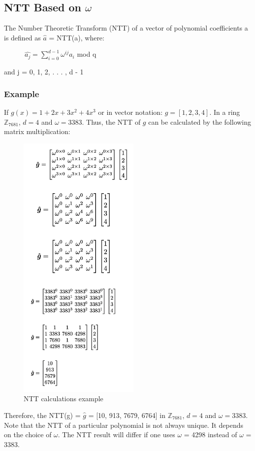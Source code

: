 \documentclass{techrep}
\theoremstyle{definition}
\theoremstyle{plain}
\newcommand{\Z}{\mathbb{Z}}
\begin{document}
	\subsection{NTT Based on $\omega$}
	The Number Theoretic Transform (NTT) of a vector of polynomial coefficients a is defined as $\hat{a}$ = NTT(a), where:

	$\quad \quad \quad \hat{a_j} = \sum_{i=0}^{d - 1}\omega^{ij}a_i$ mod q

	and j = 0, 1, 2, . . . , d - 1

	\subsubsection{Example}

	If $g(x) = 1 + 2x + 3x^2 + 4x^3$ or in vector notation:  $g = [1, 2, 3, 4]$.
	In a ring $\Z_{7681}$, $d = 4$ and $\omega =3383$. Thus, the NTT of $g$ can be calculated by the following matrix multiplication:


	\begin{figure}[H]
		\centering
		\includegraphics[width=.4\columnwidth]{fig/NTT_cal.png}
		\caption{NTT calculations example}
		\label{fig:NTT_cal}
	\end{figure}

	Therefore, the NTT(g) = $\hat{g}$ = [10, 913, 7679, 6764] in $\Z_{7681}$, $d = 4$ and $\omega =3383$. Note that the NTT of a particular polynomial is not always unique. It depends on the choice of $\omega$. The NTT result will differ if one uses $\omega$ = 4298 instead of $\omega$ = 3383.
\end{document}
